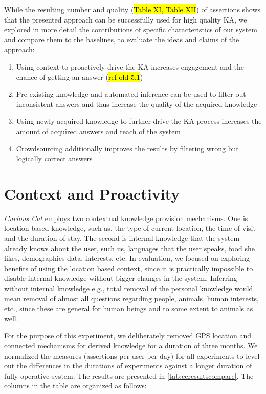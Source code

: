 While the resulting number and quality (\hl{Table XI, Table XII}) of assertions
shows that the presented approach can be successfully used for high quality KA,
we explored in more detail the contributions of specific characteristics of our
system and compare them to the baselines, to evaluate the ideas and claims
of the approach:
\begin{enumerate}
\item Using context to proactively drive the KA increases engagement and the 
chance of getting an answer (\hl{ref old 5.1})
\item Pre-existing knowledge and automated inference can be used to filter-out 
inconsistent answers and thus increase the quality of the acquired knowledge
\item Using newly acquired knowledge to further drive the KA process increases the amount of acquired answers and reach of the system
\item Crowdsourcing additionally improves the results by filtering wrong but logically correct answers
\end{enumerate}

\section{Context and Proactivity}
\label{section:evaluationContext}
\emph{Curious Cat} employs two contextual knowledge provision mechanisms. One 
is location based knowledge, such as, the type of current location, the time of
visit and the duration of stay. The second is internal knowledge that the 
system already knows about the user, such us, languages that the user speaks, 
food she likes, demographics data, interests, etc. In evaluation, we focused on
exploring benefits of using the location based context, since it is practically
impossible to disable internal knowledge without bigger changes in the system. 
Inferring without internal knowledge e.g., total removal of the personal 
knowledge would mean removal of almost all questions regarding people, animals,
human interests, etc., since these are general for human beings and to some 
extent to animals as well.

For the purpose of this experiment, we deliberately removed GPS location and 
connected mechanisms for derived knowledge for a duration of three months. We 
normalized the measures (assertions per user per day) for all experiments to 
level out the differences in the durations of experiments against a longer 
duration of fully operative system. The results are presented in 
\autoref{tab:ccresultscompare}. The columns in the table are organized as 
follows:


